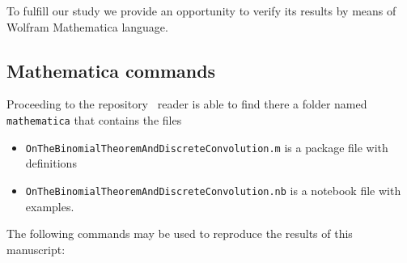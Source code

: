 To fulfill our study we provide an opportunity to verify its results by means of Wolfram Mathematica language.

\subsection{Mathematica commands} \label{subsec:mathematica-commands}
Proceeding to the repository~\cite{PK22Source} reader is able to find there a folder named \texttt{mathematica}
that contains the files
\begin{itemize}
    \item \texttt{OnTheBinomialTheoremAndDiscreteConvolution.m} is a package file with definitions
    \item \texttt{OnTheBinomialTheoremAndDiscreteConvolution.nb} is a notebook file with examples.
\end{itemize}
The following commands may be used to reproduce the results of this manuscript:
